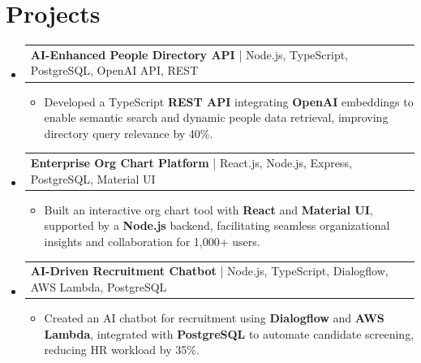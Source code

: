 \documentclass[letterpaper,10pt]{article}
\makeatletter
\newcommand{\resumeItem}[1]{
  \item{\fontsize{8pt}{9pt}\selectfont
    #1 \vspace{-3pt}
  }
}
\newcommand{\resumeProjectHeading}[2]{
    \item
    \begin{tabular*}{1.001\textwidth}{l@{\extracolsep{\fill}}r}
      \fontsize{8.5pt}{10pt}#1 & \textbf{\fontsize{8.5pt}{10pt} #2}\\
    \end{tabular*}\vspace{-7pt}
}
\newcommand{\resumeSubHeadingListStart}{\begin{itemize}[leftmargin=0pt, label={}]}
\newcommand{\resumeSubHeadingListEnd}{\end{itemize}}
\newcommand{\resumeItemListStart}{\begin{itemize}[leftmargin=*]}
\newcommand{\resumeItemListEnd}{\end{itemize}\vspace{-5pt}}
\makeatother
\begin{document}
\section{Projects}
    \vspace{-5pt}
    \resumeSubHeadingListStart
          \resumeProjectHeading
            {\textbf{AI-Enhanced People Directory API} | Node.js, TypeScript, PostgreSQL, OpenAI API, REST}{}
            \resumeItemListStart
                \resumeItem{Developed a TypeScript \textbf{REST API} integrating \textbf{OpenAI} embeddings to enable semantic search and dynamic people data retrieval, improving directory query relevance by 40\%.}
            \resumeItemListEnd
        \vspace{-12pt}
    
        \resumeProjectHeading
            {\textbf{Enterprise Org Chart Platform} | React.js, Node.js, Express, PostgreSQL, Material UI}{}
        \resumeItemListStart
                \resumeItem{Built an interactive org chart tool with \textbf{React} and \textbf{Material UI}, supported by a \textbf{Node.js} backend, facilitating seamless organizational insights and collaboration for 1,000+ users.}
        \resumeItemListEnd
      \vspace{-12pt}
      \resumeProjectHeading
        {\textbf{AI-Driven Recruitment Chatbot} | Node.js, TypeScript, Dialogflow, AWS Lambda, PostgreSQL}{}
    \resumeItemListStart
            \resumeItem{Created an AI chatbot for recruitment using \textbf{Dialogflow} and \textbf{AWS Lambda}, integrated with \textbf{PostgreSQL} to automate candidate screening, reducing HR workload by 35\%.}
    \resumeItemListEnd
    \resumeSubHeadingListEnd
\end{document}

